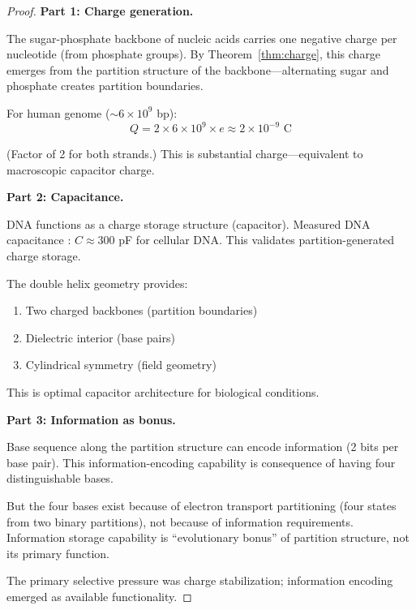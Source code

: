 \documentclass[twocolumn,10pt,a4paper]{article}
\theoremstyle{definition}
\theoremstyle{remark}
\begin{document}
\begin{proof}
\textbf{Part 1: Charge generation.}

The sugar-phosphate backbone of nucleic acids carries one negative charge per nucleotide (from phosphate groups). By Theorem~\ref{thm:charge}, this charge emerges from the partition structure of the backbone---alternating sugar and phosphate creates partition boundaries.

For human genome ($\sim 6 \times 10^9$ bp):
\begin{equation}
    Q = 2 \times 6 \times 10^9 \times e \approx 2 \times 10^{-9} \text{ C}
\end{equation}

(Factor of 2 for both strands.) This is substantial charge---equivalent to macroscopic capacitor charge.

\textbf{Part 2: Capacitance.}

DNA functions as a charge storage structure (capacitor). Measured DNA capacitance \cite{kornyshev2007}: $C \approx 300$ pF for cellular DNA. This validates partition-generated charge storage.

The double helix geometry provides:
\begin{enumerate}
    \item Two charged backbones (partition boundaries)
    \item Dielectric interior (base pairs)
    \item Cylindrical symmetry (field geometry)
\end{enumerate}

This is optimal capacitor architecture for biological conditions.

\textbf{Part 3: Information as bonus.}

Base sequence along the partition structure can encode information (2 bits per base pair). This information-encoding capability is consequence of having four distinguishable bases.

But the four bases exist because of electron transport partitioning (four states from two binary partitions), not because of information requirements. Information storage capability is ``evolutionary bonus'' of partition structure, not its primary function.

The primary selective pressure was charge stabilization; information encoding emerged as available functionality.
\end{proof}
\end{document}
